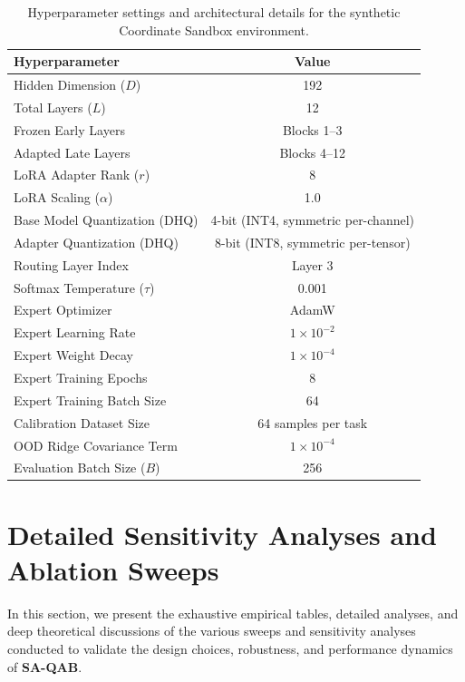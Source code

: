 \documentclass{article}
\theoremstyle{plain}
\theoremstyle{definition}
\theoremstyle{remark}
\begin{document}
\begin{table}[h]
\caption{Hyperparameter settings and architectural details for the synthetic Coordinate Sandbox environment.}
\label{tab:hyperparameters}
\vskip 0.15in
\begin{center}
\begin{small}
\begin{tabular}{lc}
\toprule
Hyperparameter & Value \\
\midrule
Hidden Dimension ($D$) & 192 \\
Total Layers ($L$) & 12 \\
Frozen Early Layers & Blocks 1--3 \\
Adapted Late Layers & Blocks 4--12 \\
LoRA Adapter Rank ($r$) & 8 \\
LoRA Scaling ($\alpha$) & 1.0 \\
Base Model Quantization (DHQ) & 4-bit (INT4, symmetric per-channel) \\
Adapter Quantization (DHQ) & 8-bit (INT8, symmetric per-tensor) \\
Routing Layer Index & Layer 3 \\
Softmax Temperature ($\tau$) & 0.001 \\
\midrule
Expert Optimizer & AdamW \\
Expert Learning Rate & $1 \times 10^{-2}$ \\
Expert Weight Decay & $1 \times 10^{-4}$ \\
Expert Training Epochs & 8 \\
Expert Training Batch Size & 64 \\
\midrule
Calibration Dataset Size & 64 samples per task \\
OOD Ridge Covariance Term & $1 \times 10^{-4}$ \\
Evaluation Batch Size ($B$) & 256 \\
\bottomrule
\end{tabular}
\end{small}
\end{center}
\vskip -0.1in
\end{table}

\newpage
\section{Detailed Sensitivity Analyses and Ablation Sweeps}
\label{sec:appendix_sweeps}

In this section, we present the exhaustive empirical tables, detailed analyses, and deep theoretical discussions of the various sweeps and sensitivity analyses conducted to validate the design choices, robustness, and performance dynamics of \textbf{SA-QAB}.
\end{document}
